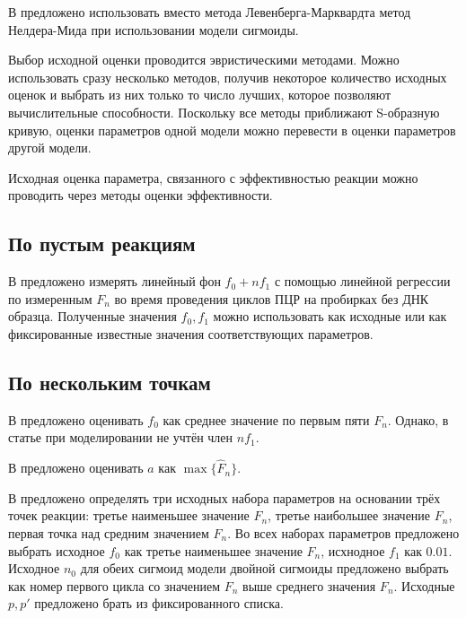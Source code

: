 В \cite{liuProgressCurveAnalysis2011, goudarRobustParameterEstimation2009}
предложено использовать вместо метода Левенберга\hyp{}Марквардта метод Нелдера-Мида
при использовании модели сигмоиды.

Выбор исходной оценки проводится эвристическими методами. Можно использовать
сразу несколько методов, получив некоторое количество исходных оценок и
выбрать из них только то число лучших, которое позволяют вычислительные
способности. Поскольку все методы приближают S-образную кривую, оценки
параметров одной модели можно перевести в оценки параметров другой модели.

Исходная оценка параметра, связанного с эффективностью реакции можно проводить
через методы оценки эффективности.

\subsection{По пустым реакциям}

В \cite{peccoudStatisticalEstimationsPCR1998} предложено измерять линейный фон
$f_0+nf_1$ с помощью линейной регрессии по измеренным $F_{n}$ во время
проведения циклов ПЦР на пробирках без ДНК образца. Полученные значения
$f_0,f_1$ можно использовать как исходные или как фиксированные известные
значения соответствующих параметров.

\subsection{По нескольким точкам}\label{ssec:patent}

В \cite{barKineticOutlierDetection2003} предложено оценивать $f_0$ как среднее
значение по первым пяти $F_{n}$. Однако, в статье при моделировании не учтён
член $nf_1$.

В \cite{liuProgressCurveAnalysis2011} предложено оценивать $a$ как
$\max\{\hat{F}_{n}\}$.

В \cite{kurnikPCRElbowDetermination2007,kurnikPCRElbowDetermination2011}
предложено определять три исходных набора параметров на основании трёх точек
реакции: третье наименьшее значение $F_{n}$, третье наибольшее значение
$F_{n}$, первая точка над средним значением $F_{n}$. Во всех наборах параметров
предложено выбрать исходное $f_0$ как третье наименьшее значение $F_{n}$,
исхнодное $f_1$ как $0.01$. Исходное $n_0$ для обеих сигмоид модели двойной
сигмоиды предложено выбрать как номер первого цикла со значением $F_{n}$ выше
среднего значения $F_{n}$. Исходные $p,p'$ предложено брать из фиксированного
списка.

